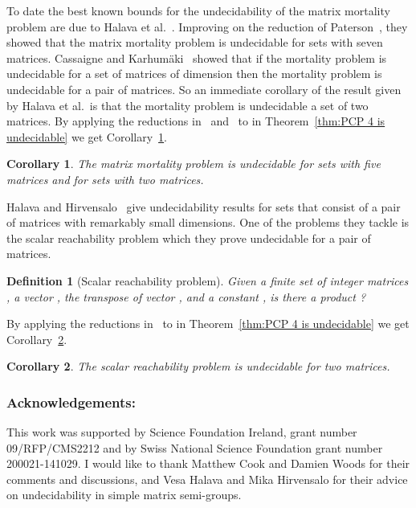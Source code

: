 \documentclass[11pt]{article} \usepackage{amsfonts,amsmath,amssymb,amsthm}
\newtheorem{corollary}{Corollary}
\newtheorem{definition}{Definition}
\begin{document}
To date the best known bounds for the undecidability of the matrix mortality problem are due to Halava et al.~\cite{Halava2007}. Improving on the reduction of Paterson~\cite{Paterson1970}, they showed that the matrix mortality problem is undecidable for sets with seven  matrices. 
Cassaigne and Karhum\"{a}ki~\cite{Cassaigne1998} showed that if the mortality problem is undecidable for a set of  matrices of dimension  then the mortality problem is undecidable for a pair of  matrices. 
So an immediate corollary of the result given by Halava et al.~is that the mortality problem is undecidable a set of two  matrices.
By applying the reductions in~\cite{Halava2001} and~\cite{Cassaigne1998} to  in Theorem~\ref{thm:PCP 4 is undecidable} we get Corollary~\ref{cor:matrix mortality}.
\begin{corollary}\label{cor:matrix mortality}
The matrix mortality problem is undecidable for sets with five  matrices and for sets with two  matrices. 
\end{corollary}

Halava and Hirvensalo~\cite{Halava2007A} give undecidability results for sets that consist of a pair of matrices with remarkably small dimensions. 
One of the problems they tackle is the scalar reachability problem which they prove undecidable for a pair of  matrices.
\begin{definition}[Scalar reachability problem]
Given a finite set of  integer matrices  , a vector ,  the transpose of vector , and a constant , is there a product ? 
\end{definition}
By applying the reductions in~\cite{Halava2007A} to  in Theorem~\ref{thm:PCP 4 is undecidable} we get Corollary~\ref{cor:scalar reachability}.
\begin{corollary}\label{cor:scalar reachability}
The scalar reachability problem is undecidable for two  matrices. 
\end{corollary}









\subsubsection*{Acknowledgements:}
This work was supported by Science Foundation Ireland, grant number 09/RFP/CMS2212 and by Swiss National Science Foundation grant number 200021-141029. I would like to thank Matthew Cook and Damien Woods for their comments and discussions, and Vesa Halava and Mika Hirvensalo for their advice on  undecidability in simple matrix semi-groups.



\end{document}
